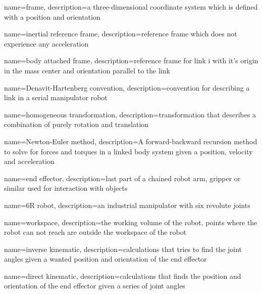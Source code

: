 \makeglossaries

{
    name={frame},
    description={a three-dimensional coordinate system which is defined with a position and orientation}
}

{
    name={inertial reference frame},
    description={reference frame which does not experience any acceleration}
}
 
 
{
    name={body attached frame},
    description={reference frame for link i with it's origin in the mass center and orientation parallel to the link}
}

{
    name={Denavit-Hartenberg convention},
    description={convention for describing a link in a serial manipulator robot}
}

{
    name={homogeneous transformation},
    description={transformation that describes a combination of purely rotation and translation}
}


{
    name={Newton-Euler method},
    description={A forward-backward recursion method to solve for forces and torques in a linked body system given a position, velocity and acceleration}
}

{
    name={end effector},
    description={last part of a chained robot arm, gripper or similar used for interaction with objects}
}

{
    name={6R robot},
    description={an industrial manipulator with six revolute joints}
}

{
    name={workspace},
    description={the working volume of the robot, points where the robot can not reach are outside the workspace of the robot}
}

{
    name={inverse kinematic},
    description={calculations that tries to find the joint angles given a wanted position and orientation of the end effector}
}


{
    name={direct kinematic},
    description={calculations that finds the position and orientation of the end effector given a series of joint angles}
}

